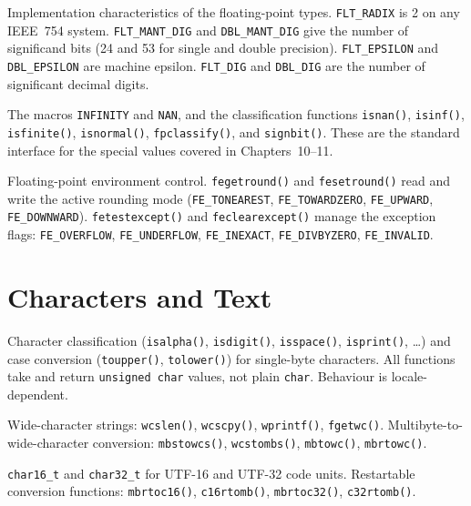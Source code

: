\begin{description}[leftmargin=0pt, itemsep=10pt]

\item[\texttt{<float.h>}]
Implementation characteristics of the floating-point types.
\texttt{FLT\_RADIX} is 2 on any IEEE~754 system.
\texttt{FLT\_MANT\_DIG} and \texttt{DBL\_MANT\_DIG} give the number of
significand bits (24 and 53 for single and double precision).
\texttt{FLT\_EPSILON} and \texttt{DBL\_EPSILON} are machine epsilon.
\texttt{FLT\_DIG} and \texttt{DBL\_DIG} are the number of significant
decimal digits.

\item[\texttt{<math.h>}]
The macros \texttt{INFINITY} and \texttt{NAN}, and the classification
functions \texttt{isnan()}, \texttt{isinf()}, \texttt{isfinite()},
\texttt{isnormal()}, \texttt{fpclassify()}, and \texttt{signbit()}.
These are the standard interface for the special values covered in
Chapters~10--11.

\item[\texttt{<fenv.h>} \textnormal{(C99)}]
Floating-point environment control. \texttt{fegetround()} and
\texttt{fesetround()} read and write the active rounding mode
(\texttt{FE\_TONEAREST}, \texttt{FE\_TOWARDZERO}, \texttt{FE\_UPWARD},
\texttt{FE\_DOWNWARD}). \texttt{fetestexcept()} and \texttt{feclearexcept()}
manage the exception flags: \texttt{FE\_OVERFLOW}, \texttt{FE\_UNDERFLOW},
\texttt{FE\_INEXACT}, \texttt{FE\_DIVBYZERO}, \texttt{FE\_INVALID}.

\end{description}

\section{Characters and Text}

\begin{description}[leftmargin=0pt, itemsep=10pt]

\item[\texttt{<ctype.h>}]
Character classification (\texttt{isalpha()}, \texttt{isdigit()},
\texttt{isspace()}, \texttt{isprint()}, \ldots) and case conversion
(\texttt{toupper()}, \texttt{tolower()}) for single-byte characters.
All functions take and return \texttt{unsigned char} values, not plain
\texttt{char}. Behaviour is locale-dependent.

\item[\texttt{<wchar.h>} \textnormal{(C95)}]
Wide-character strings: \texttt{wcslen()}, \texttt{wcscpy()},
\texttt{wprintf()}, \texttt{fgetwc()}. Multibyte-to-wide-character
conversion: \texttt{mbstowcs()}, \texttt{wcstombs()}, \texttt{mbtowc()},
\texttt{mbrtowc()}.

\item[\texttt{<uchar.h>} \textnormal{(C11)}]
\texttt{char16\_t} and \texttt{char32\_t} for UTF-16 and UTF-32 code units.
Restartable conversion functions: \texttt{mbrtoc16()}, \texttt{c16rtomb()},
\texttt{mbrtoc32()}, \texttt{c32rtomb()}.

\end{description}

